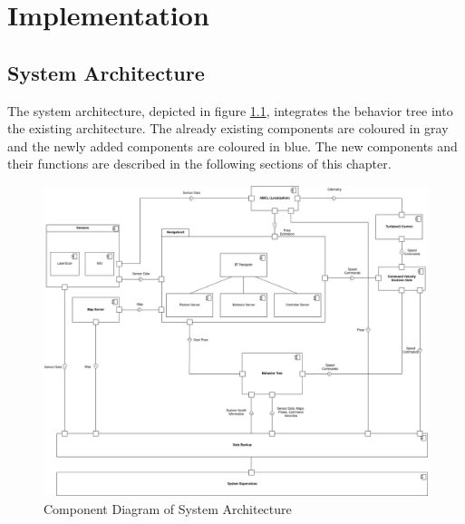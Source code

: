 \chapter{Implementation}
\label{cha:implementierung}

\section{System Architecture}

The system architecture, depicted in figure \ref{fig:component_diagram}, integrates the behavior tree into the existing architecture. 
The already existing components are coloured in gray and the newly added components are coloured in blue.
The new components and their functions are described in the following sections of this chapter.  

\begin{figure}[ht]
	\label{fig:component_diagram}
	\includegraphics[width=1.00\textwidth]{images/component_diagram_bt.png}
	\caption{Component Diagram of System Architecture}
\end{figure}

